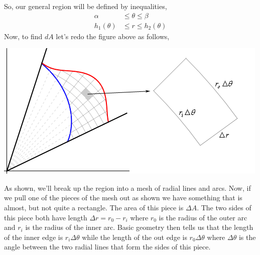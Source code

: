 \documentclass[10pt,reqno]{book}
\theoremstyle{definition}
\begin{document}
	\begin{center}
	\end{center}
	So, our general region will be defined by inequalities,
	\begin{align*}
		\alpha &\leq \theta \leq \beta\\
		h_1(\theta) &\leq r \leq h_2(\theta)
	\end{align*}
	Now, to find $ dA $ let's redo the figure above as follows,
	\begin{center}
		\includegraphics[scale=0.5]{polar.png}
	\end{center}
	As shown, we'll break up the region into a mesh of radial lines and arcs. Now, if we pull one of the pieces of the mesh out as shown we have something that is almost, but not quite a rectangle. The area of this piece is $ \Delta A $. The two sides of this piece both have length $ \Delta r = r_0 - r_i $ where $ r_0 $ is the radius of the outer arc and $ r_i $ is the radius of the inner arc. Basic geometry then tells us that the length of the inner edge is $ r_i \Delta \theta $ while the length of the out edge is $ r_0 \Delta \theta $ where $ \Delta \theta $ is the angle between the two radial lines that form the sides of this piece.\\ \\
\end{document}
